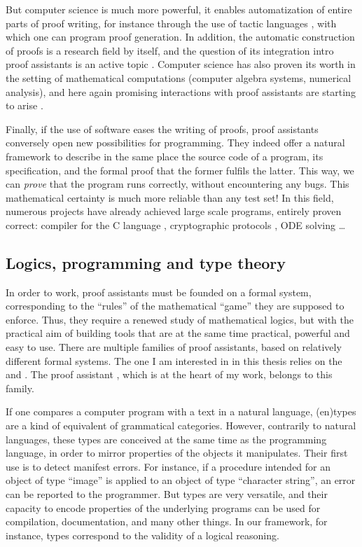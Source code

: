 But computer science is much more powerful, it enables automatization of entire parts of
proof writing, for instance through the use of tactic languages ,
with which one can program proof generation.
In addition, the automatic construction of proofs is a research field by itself,
and the question of its integration intro proof assistants is an active topic
. Computer science has also proven its worth in the
setting of mathematical computations (computer algebra systems, numerical analysis),
and here again promising interactions with proof assistants are starting to arise
.

Finally, if the use of software eases the writing of proofs, proof assistants conversely
open new possibilities for programming. They indeed offer a natural framework to describe in
the same place the source code of a program, its specification, and the formal proof that the
former fulfils the latter. This way, we can \emph{prove} that the program runs correctly,
without encountering any bugs.
This mathematical certainty is much more reliable than any test set!
In this field, numerous projects have already achieved large scale programs, entirely proven
correct: compiler for the C language , cryptographic protocols , ODE solving …

\subsection{Logics, programming and type theory}

In order to work, proof assistants must be founded on a formal system, corresponding to
the “rules” of the mathematical “game” they are supposed to enforce.
Thus, they require a renewed study of mathematical logics, but with the practical aim of
building tools that are at the same time practical, powerful and easy to use.
There are multiple families of proof assistants, based on relatively different formal systems.
The one I am interested in in this thesis relies on the 
and . The proof assistant ,
which is at the heart of my work, belongs to this family.

If one compares a computer program with a text in a natural language,
\intro(en){types}
are a kind of equivalent of grammatical categories. However, contrarily to natural
languages, these types are conceived at the same time as the programming language, in order
to mirror properties of the objects it manipulates.
Their first use is to detect manifest errors. For instance, if a procedure
intended for an object of type “image” is applied to an object of type “character string”,
an error can be reported to the programmer.%
%
But types are very versatile, and their capacity to encode properties of the underlying
programs can be used for compilation, documentation, and many other things. In our
framework, for instance, types correspond to the validity of a logical reasoning.

